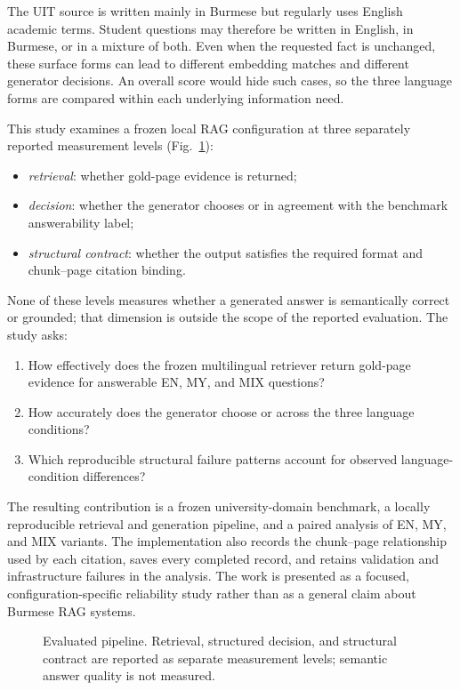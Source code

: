 \documentclass[a4paper,conference]{IEEEtran}
\newcommand{\code}[1]{\texttt{\detokenize{#1}}}
\begin{document}
The UIT source is written mainly in Burmese but regularly uses English academic terms. Student questions may therefore be written in English, in Burmese, or in a mixture of both. Even when the requested fact is unchanged, these surface forms can lead to different embedding matches and different generator decisions. An overall score would hide such cases, so the three language forms are compared within each underlying information need.

This study examines a frozen local RAG configuration at three separately reported measurement levels (Fig.~\ref{fig:pipeline}):
\begin{itemize}
    \item \emph{retrieval}: whether gold-page evidence is returned;
    \item \emph{decision}: whether the generator chooses \code{ANSWER} or \code{ABSTAIN} in agreement with the benchmark answerability label;
    \item \emph{structural contract}: whether the output satisfies the required format and chunk--page citation binding.
\end{itemize}
None of these levels measures whether a generated answer is semantically correct or grounded; that dimension is outside the scope of the reported evaluation. The study asks:
\begin{enumerate}
    \item How effectively does the frozen multilingual retriever return gold-page evidence for answerable EN, MY, and MIX questions?
    \item How accurately does the generator choose \code{ANSWER} or \code{ABSTAIN} across the three language conditions?
    \item Which reproducible structural failure patterns account for observed language-condition differences?
\end{enumerate}

The resulting contribution is a frozen university-domain benchmark, a locally reproducible retrieval and generation pipeline, and a paired analysis of EN, MY, and MIX variants. The implementation also records the chunk--page relationship used by each citation, saves every completed record, and retains validation and infrastructure failures in the analysis. The work is presented as a focused, configuration-specific reliability study rather than as a general claim about Burmese RAG systems.

\begin{figure}[t]
\centering

\caption{Evaluated pipeline. Retrieval, structured decision, and structural contract are reported as separate measurement levels; semantic answer quality is not measured.}
\label{fig:pipeline}
\end{figure}
\end{document}
